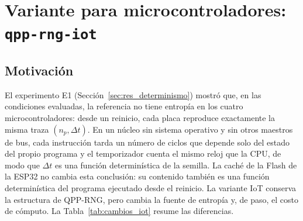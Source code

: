 \section{Variante para microcontroladores: \texttt{qpp-rng-iot}}
\label{sec:variante_iot}

\subsection{Motivación}

El experimento E1 (Sección~\ref{sec:res_determinismo}) mostró que, en las condiciones evaluadas, la referencia no tiene entropía en los cuatro microcontroladores: desde un reinicio, cada placa reproduce exactamente la misma traza $(n_p, \Delta t)$. En un núcleo sin sistema operativo y sin otros maestros de bus, cada instrucción tarda un número de ciclos que depende solo del estado del propio programa y el temporizador cuenta el mismo reloj que la CPU, de modo que $\Delta t$ es una función determinística de la semilla. La caché de la Flash de la ESP32 no cambia esta conclusión: su contenido también es una función determinística del programa ejecutado desde el reinicio. La variante IoT conserva la estructura de QPP-RNG, pero cambia la fuente de entropía y, de paso, el costo de cómputo. La Tabla~\ref{tab:cambios_iot} resume las diferencias.

